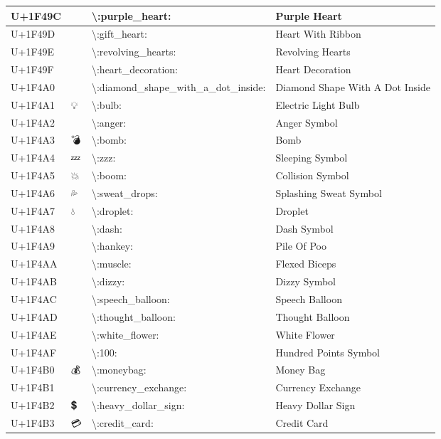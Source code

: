 \begin{table}[h]
\begin{tabulary}{\linewidth}{|L|L|L|L|}
\hline
U+1F49C & 💜 & {\textbackslash}:purple\_heart: & Purple Heart \\
\hline
U+1F49D & 💝 & {\textbackslash}:gift\_heart: & Heart With Ribbon \\
\hline
U+1F49E & 💞 & {\textbackslash}:revolving\_hearts: & Revolving Hearts \\
\hline
U+1F49F & 💟 & {\textbackslash}:heart\_decoration: & Heart Decoration \\
\hline
U+1F4A0 & 💠 & {\textbackslash}:diamond\_shape\_with\_a\_dot\_inside: & Diamond Shape With A Dot Inside \\
\hline
U+1F4A1 & 💡 & {\textbackslash}:bulb: & Electric Light Bulb \\
\hline
U+1F4A2 & 💢 & {\textbackslash}:anger: & Anger Symbol \\
\hline
U+1F4A3 & 💣 & {\textbackslash}:bomb: & Bomb \\
\hline
U+1F4A4 & 💤 & {\textbackslash}:zzz: & Sleeping Symbol \\
\hline
U+1F4A5 & 💥 & {\textbackslash}:boom: & Collision Symbol \\
\hline
U+1F4A6 & 💦 & {\textbackslash}:sweat\_drops: & Splashing Sweat Symbol \\
\hline
U+1F4A7 & 💧 & {\textbackslash}:droplet: & Droplet \\
\hline
U+1F4A8 & 💨 & {\textbackslash}:dash: & Dash Symbol \\
\hline
U+1F4A9 & 💩 & {\textbackslash}:hankey: & Pile Of Poo \\
\hline
U+1F4AA & 💪 & {\textbackslash}:muscle: & Flexed Biceps \\
\hline
U+1F4AB & 💫 & {\textbackslash}:dizzy: & Dizzy Symbol \\
\hline
U+1F4AC & 💬 & {\textbackslash}:speech\_balloon: & Speech Balloon \\
\hline
U+1F4AD & 💭 & {\textbackslash}:thought\_balloon: & Thought Balloon \\
\hline
U+1F4AE & 💮 & {\textbackslash}:white\_flower: & White Flower \\
\hline
U+1F4AF & 💯 & {\textbackslash}:100: & Hundred Points Symbol \\
\hline
U+1F4B0 & 💰 & {\textbackslash}:moneybag: & Money Bag \\
\hline
U+1F4B1 & 💱 & {\textbackslash}:currency\_exchange: & Currency Exchange \\
\hline
U+1F4B2 & 💲 & {\textbackslash}:heavy\_dollar\_sign: & Heavy Dollar Sign \\
\hline
U+1F4B3 & 💳 & {\textbackslash}:credit\_card: & Credit Card \\

\end{tabulary}
\end{table}
